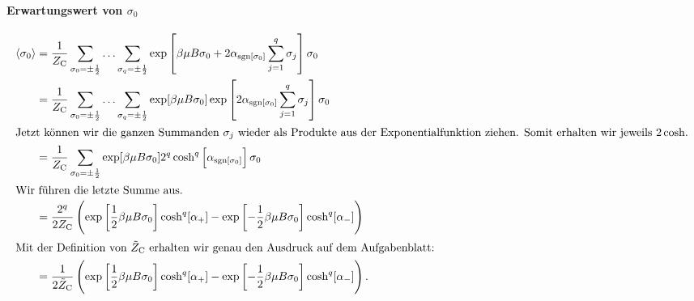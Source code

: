 \fehlt

\paragraph{Erwartungswert von $\sigma_0$}

\begin{align*}
    \bracket{\sigma_0}
    &= \frac{1}{Z_\text C} \sum_{\sigma_0 = \pm\frac12} \ldots \sum_{\sigma_q = \pm\frac12}
    \exp\sbr{\beta \mu B \sigma_0 + 2 \alpha_{\sgn[\sigma_0]} \sum_{j=1}^q
    \sigma_j} \sigma_0 \\
    &= \frac{1}{Z_\text C} \sum_{\sigma_0 = \pm\frac12} \ldots \sum_{\sigma_q = \pm\frac12}
    \exp[\beta \mu B \sigma_0] 
    \exp\sbr{2 \alpha_{\sgn[\sigma_0]} \sum_{j=1}^q
    \sigma_j} \sigma_0 \\
    \intertext{%
        Jetzt können wir die ganzen Summanden $\sigma_j$ wieder als Produkte
        aus der Exponentialfunktion ziehen. Somit erhalten wir jeweils $2
        \cosh$.
    }
    &= \frac{1}{Z_\text C} \sum_{\sigma_0 = \pm\frac12}
    \exp[\beta \mu B \sigma_0] 
    2^q \cosh^q\sbr{\alpha_{\sgn[\sigma_0]}} \sigma_0 \\
    \intertext{%
        Wir führen die letzte Summe aus.
    }
    &= \frac{2^q}{2 Z_\text C} \del{
        \exp\sbr{\frac 12 \beta \mu B \sigma_0} \cosh^q[\alpha_+]
        - \exp\sbr{-\frac 12 \beta \mu B \sigma_0} \cosh^q[\alpha_-]
    } \\
    \intertext{%
        Mit der Definition von $\tilde Z_\text C$ erhalten wir genau den
        Ausdruck auf dem Aufgabenblatt:
    }
    &= \frac{1}{2 \tilde Z_\text C} \del{
        \exp\sbr{\frac 12 \beta \mu B \sigma_0} \cosh^q[\alpha_+]
        - \exp\sbr{-\frac 12 \beta \mu B \sigma_0} \cosh^q[\alpha_-]
    }.
\end{align*}

\IfFileExists{\bibliographyfile}{
    \printbibliography
}{}



